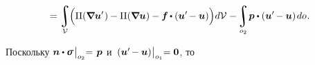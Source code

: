 \begin{otherlanguage}{russian}
\nopagebreak\vspace{-0.16em}\begin{equation*}
= \displaystyle
\integral\displaylimits_{\mathcal{V}} \hspace{-0.6ex}
\left(^{\mathstrut} \hspace{-0.1ex}
\Pi(\boldnabla \bm{u}'\hspace{.1ex}) - \Pi(\boldnabla \bm{u}) - \bm{f} \hspace{-0.1ex} \dotp ( \bm{u}' \hspace{-0.2ex} - \bm{u} ) \right) \hspace{-0.32ex} d\mathcal{V} \hspace{.1ex}
- \hspace{-0.2ex}
\integral\displaylimits_{o_2} \hspace{-0.32ex} \bm{p} \dotp ( \bm{u}' \hspace{-0.2ex} - \bm{u} ) \hspace{.25ex} do \hspace{.1ex} .
\vspace{-0.25em}\end{equation*}

\vspace{-0.1em} \noindent Поскольку ${\bm{n} \dotp \linearstress \hspace{.16ex} \bigr|_{o_2} \hspace{-0.64ex} = \hspace{.2ex} \bm{p}}$ и~${( \bm{u}' \hspace{-0.2ex} - \bm{u} ) \hspace{.1ex} \bigr|_{o_1} \hspace{-0.64ex} = \bm{0}}$, то


\end{otherlanguage}
